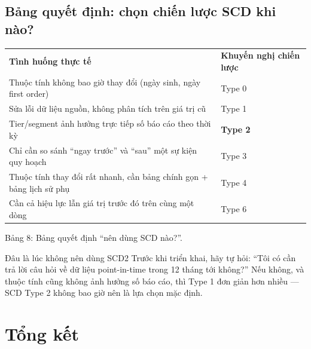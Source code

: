 \documentclass[12pt]{article}
\begin{document}
\subsection{Bảng quyết định: chọn chiến lược SCD khi nào?}

\noindent
\begin{longtable}{@{}>{\RaggedRight\arraybackslash}p{7.6cm}>{\RaggedRight\arraybackslash}p{6.6cm}@{}}
\rowcolor{rowLavender}
\textbf{Tình huống thực tế} & \textbf{Khuyến nghị chiến lược} \\
\addlinespace[3pt]
\endhead
Thuộc tính không bao giờ thay đổi (ngày sinh, ngày first order) & Type 0 \\
\addlinespace[3pt]
Sửa lỗi dữ liệu nguồn, không phân tích trên giá trị cũ & Type 1 \\
\addlinespace[3pt]
Tier/segment ảnh hưởng trực tiếp số báo cáo theo thời kỳ & \textbf{Type 2} \\
\addlinespace[3pt]
Chỉ cần so sánh ``ngay trước'' và ``sau'' một sự kiện quy hoạch & Type 3 \\
\addlinespace[3pt]
Thuộc tính thay đổi rất nhanh, cần bảng chính gọn + bảng lịch sử phụ & Type 4 \\
\addlinespace[3pt]
Cần cả hiệu lực lẫn giá trị trước đó trên cùng một dòng & Type 6 \\
\end{longtable}

\begin{captionbelowboxaivn}
Bảng 8: Bảng quyết định ``nên dùng SCD nào?''.
\end{captionbelowboxaivn}

\begin{guidelinebox}{Đâu là lúc không nên dùng SCD2}
Trước khi triển khai, hãy tự hỏi: ``Tôi có cần trả lời câu hỏi về dữ liệu point-in-time trong 12 tháng tới không?'' Nếu không, và thuộc tính cũng không ảnh hưởng số báo cáo, thì Type 1 đơn giản hơn nhiều --- SCD Type 2 không bao giờ nên là lựa chọn mặc định.
\end{guidelinebox}

\section{Tổng kết}
\end{document}
